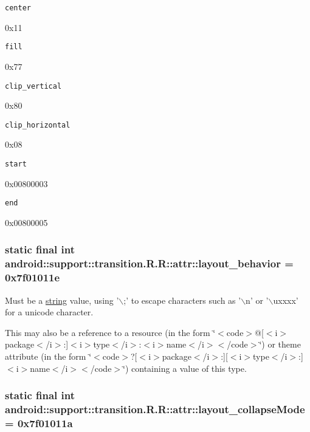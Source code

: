 {\tt center}

0x11

{\tt fill}

0x77

{\tt clip\_\-vertical}

0x80

{\tt clip\_\-horizontal}

0x08

{\tt start}

0x00800003

{\tt end}

0x00800005\hypertarget{classandroid_1_1support_1_1transition_1_1_r_1_1attr_a85bbd8c93bb3382b61fbe9da5c62bf4}{
\subsubsection[{layout\_\-behavior}]{\setlength{\rightskip}{0pt plus 5cm}static final int android::support::transition.R.R::attr::layout\_\-behavior = 0x7f01011e}}
\label{classandroid_1_1support_1_1transition_1_1_r_1_1attr_a85bbd8c93bb3382b61fbe9da5c62bf4}


Must be a \hyperlink{classandroid_1_1support_1_1transition_1_1_r_1_1string}{string} value, using '$\backslash$;' to escape characters such as '$\backslash$n' or '$\backslash$uxxxx' for a unicode character. 

This may also be a reference to a resource (in the form \char`\"{}$<$code$>$@\mbox{[}$<$i$>$package$<$/i$>$:\mbox{]}$<$i$>$type$<$/i$>$:$<$i$>$name$<$/i$>$$<$/code$>$\char`\"{}) or theme attribute (in the form \char`\"{}$<$code$>$?\mbox{[}$<$i$>$package$<$/i$>$:\mbox{]}\mbox{[}$<$i$>$type$<$/i$>$:\mbox{]}$<$i$>$name$<$/i$>$$<$/code$>$\char`\"{}) containing a value of this type. \hypertarget{classandroid_1_1support_1_1transition_1_1_r_1_1attr_8b372f8040437629c55539946818fe65}{
\subsubsection[{layout\_\-collapseMode}]{\setlength{\rightskip}{0pt plus 5cm}static final int android::support::transition.R.R::attr::layout\_\-collapseMode = 0x7f01011a}}
\label{classandroid_1_1support_1_1transition_1_1_r_1_1attr_8b372f8040437629c55539946818fe65}



